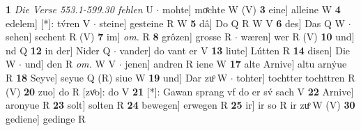 \documentclass[8pt,a4paper,notitlepage]{article}
\begin{document}
\begin{table}[ht]
\begin{minipage}[t]{0.5\linewidth}
\textbf{1} \textit{Die Verse 553.1-599.30 fehlen} U   $\cdot$ mohte] moͤchte W (V) \textbf{3} eine] alleine W \textbf{4} edelem] [*]: tv́ren V  $\cdot$ steine] gesteine R W \textbf{5} dâ] Do Q R W V \textbf{6} des] Das Q W  $\cdot$ sehen] sechent R (V) \textbf{7} im] \textit{om.} R \textbf{8} grôzen] grosse R  $\cdot$ wæren] wer R (V) \textbf{10} und] nd Q \textbf{12} in der] Nider Q  $\cdot$ vander] do vant er V \textbf{13} liute] Lútten R \textbf{14} disen] Die W  $\cdot$ und] den R \textit{om.} W V  $\cdot$ jenen] andren R iene W \textbf{17} alte Arnive] altu arnẏue R \textbf{18} Seyve] seyue Q (R) siue W \textbf{19} und] Dar zuͦ W  $\cdot$ tohter] tochtter tochttren R (V) \textbf{20} zuo] do R [zvͦo]: do V \textbf{21} [*]: Gawan sprang vf do er sv́ sach V \textbf{22} Arnive] aronyue R \textbf{23} solt] solten R \textbf{24} bewegen] erwegen R \textbf{25} ir] ir so R ir zuͦ W (V) \textbf{30} gediene] gedinge R \newline
\end{minipage}
\end{table}
\end{document}
